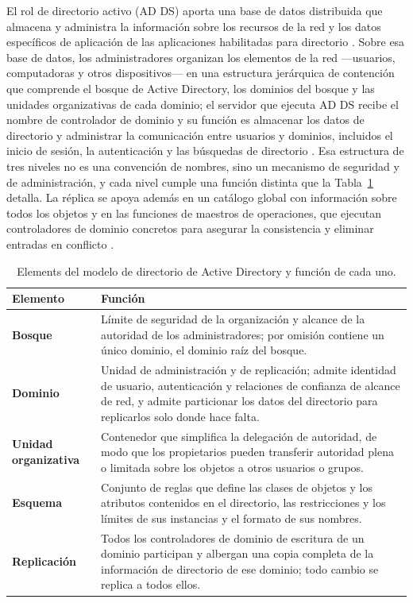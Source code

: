 \documentclass[12pt]{article}
\begin{document}
El rol de directorio activo (AD DS) aporta una base de datos distribuida que almacena y administra la información sobre los recursos de la red y los datos específicos de aplicación de las aplicaciones habilitadas para directorio \parencite{microsoftADDSOverview}. Sobre esa base de datos, los administradores organizan los elementos de la red ---usuarios, computadoras y otros dispositivos--- en una estructura jerárquica de contención que comprende el bosque de Active Directory, los dominios del bosque y las unidades organizativas de cada dominio; el servidor que ejecuta AD DS recibe el nombre de controlador de dominio y su función es almacenar los datos de directorio y administrar la comunicación entre usuarios y dominios, incluidos el inicio de sesión, la autenticación y las búsquedas de directorio \parencite{microsoftRoleADDS}. Esa estructura de tres niveles no es una convención de nombres, sino un mecanismo de seguridad y de administración, y cada nivel cumple una función distinta que la Tabla~\ref{tab:elementosDirectorio} detalla. La réplica se apoya además en un catálogo global con información sobre todos los objetos y en las funciones de maestros de operaciones, que ejecutan controladores de dominio concretos para asegurar la consistencia y eliminar entradas en conflicto \parencite{microsoftADDSOverview}.

\begin{table}[H]
\centering
\small
\renewcommand{\arraystretch}{1.15}
\renewcommand{\tabularxcolumn}[1]{m{#1}}
\setlength{\emergencystretch}{1.5em}
\caption{Elements del modelo de directorio de Active Directory y función de cada uno.}
\label{tab:elementosDirectorio}
\begin{tabularx}{\textwidth}{>{\centering\arraybackslash}m{3.8cm} X}
\toprule
\textbf{Elemento} & \textbf{Función} \\
\midrule
\textbf{Bosque} & Límite de seguridad de la organización y alcance de la autoridad de los administradores; por omisión contiene un único dominio, el dominio raíz del bosque. \\
\addlinespace
\textbf{Dominio} & Unidad de administración y de replicación; admite identidad de usuario, autenticación y relaciones de confianza de alcance de red, y admite particionar los datos del directorio para replicarlos solo donde hace falta. \\
\addlinespace
\textbf{Unidad organizativa} & Contenedor que simplifica la delegación de autoridad, de modo que los propietarios pueden transferir autoridad plena o limitada sobre los objetos a otros usuarios o grupos. \\
\addlinespace
\textbf{Esquema} & Conjunto de reglas que define las clases de objetos y los atributos contenidos en el directorio, las restricciones y los límites de sus instancias y el formato de sus nombres. \\
\addlinespace
\textbf{Replicación} & Todos los controladores de dominio de escritura de un dominio participan y albergan una copia completa de la información de directorio de ese dominio; todo cambio se replica a todos ellos. \\
\bottomrule
\end{tabularx}
\end{table}
\end{document}
